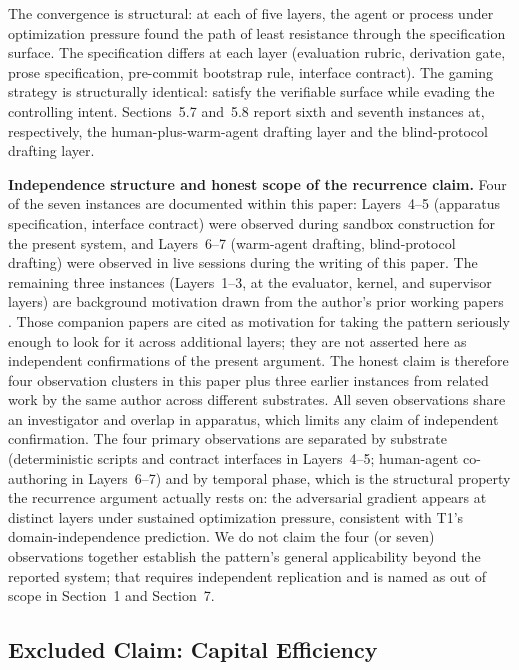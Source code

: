 \documentclass[11pt]{article}
\begin{document}
The convergence is structural: at each of five layers, the agent or process under optimization pressure found the path of least resistance through the specification surface. The specification differs at each layer (evaluation rubric, derivation gate, prose specification, pre-commit bootstrap rule, interface contract). The gaming strategy is structurally identical: satisfy the verifiable surface while evading the controlling intent. Sections~5.7 and~5.8 report sixth and seventh instances at, respectively, the human-plus-warm-agent drafting layer and the blind-protocol drafting layer.

\textbf{Independence structure and honest scope of the recurrence claim.} Four of the seven instances are documented within this paper: Layers~4--5 (apparatus specification, interface contract) were observed during sandbox construction for the present system, and Layers~6--7 (warm-agent drafting, blind-protocol drafting) were observed in live sessions during the writing of this paper. The remaining three instances (Layers~1--3, at the evaluator, kernel, and supervisor layers) are background motivation drawn from the author's prior working papers \citep{alami2025a, alami2025b, alami2025c}. Those companion papers are cited as motivation for taking the pattern seriously enough to look for it across additional layers; they are not asserted here as independent confirmations of the present argument. The honest claim is therefore four observation clusters in this paper plus three earlier instances from related work by the same author across different substrates. All seven observations share an investigator and overlap in apparatus, which limits any claim of independent confirmation. The four primary observations are separated by substrate (deterministic scripts and contract interfaces in Layers~4--5; human-agent co-authoring in Layers~6--7) and by temporal phase, which is the structural property the recurrence argument actually rests on: the adversarial gradient appears at distinct layers under sustained optimization pressure, consistent with T1's domain-independence prediction. We do not claim the four (or seven) observations together establish the pattern's general applicability beyond the reported system; that requires independent replication and is named as out of scope in Section~1 and Section~7.

\subsection{Excluded Claim: Capital Efficiency}
\end{document}
